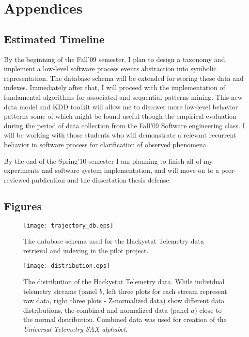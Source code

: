 \chapter{Appendices} \label{appendix}

\section{Estimated Timeline}
By the beginning of the Fall'09 semester, I plan to design a taxonomy and implement a low-level software process events abstraction into symbolic representation. The database schema will be extended for storing these data and indexes. Immediately after that, I will proceed with the implementation of fundamental algorithms for associated and sequential patterns mining. This new data model and KDD toolkit will allow me to discover more low-level behavior patterns some of which might be found useful though the empirical evaluation during the period of data collection from the Fall'09 Software engineering class. I will be working with those students who will demonstrate a relevant recurrent behavior in software process for clarification of observed phenomena.

By the end of the Spring'10 semester I am planning to finish all of my experiments and software system implementation, and will move on to a peer-reviewed publication and the dissertation thesis defense.

\section{Figures}
\begin{figure}[tbp]
   \centering
   \texttt{[image: trajectory\_db.eps]}
   \caption{The database schema used for the Hackystat Telemetry data retrieval and indexing in the pilot project.}
   \label{fig:trajectory_db}
\end{figure}

\begin{figure}[tbp]
   \centering
   \texttt{[image: distribution.eps]}
   \caption{The distribution of the Hackystat Telemetry data. While individual telemetry streams (panel $b$, left three plots for each stream represent raw data, right three plots - Z-normalized data) show different data distributions, the combined and normalized data (panel $a$) close to the normal distribution. Combined data was used for creation of the \textit{Universal Telemetry SAX alphabet}.}
   \label{fig:distribution}
\end{figure}


